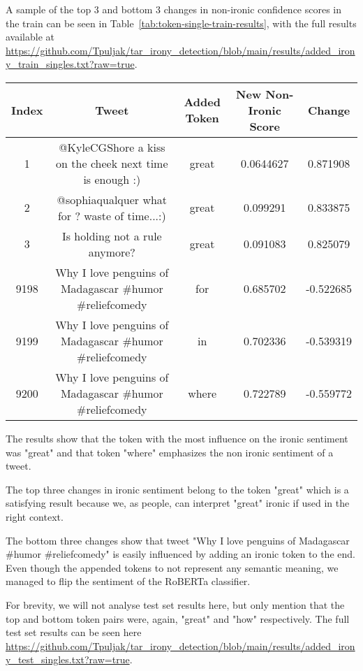 \documentclass[10pt, a4paper]{article}
\begin{document}
A sample of the top 3 and bottom 3 changes in non-ironic confidence scores in the train can be seen in Table~\ref{tab:token-single-train-results}, with the full results available at \url{https://github.com/Tpuljak/tar_irony_detection/blob/main/results/added_irony_train_singles.txt?raw=true}.

\begin{table*}
\caption{Sample of Single Token Results on the Train Set}
\label{tab:token-single-train-results}
\begin{center}
\begin{tabular}{c|c|c|c|c}
\toprule
Index & Tweet & Added Token & New Non-Ironic Score & Change\\
\midrule
1     & @KyleCGShore a kiss on the cheek next time is enough :)   & great & 0.0644627 & 0.871908 \\
2     & @sophiaqualquer what for ? waste of time...:)             & great & 0.099291  & 0.833875 \\
3     & Is holding not a rule anymore?                            & great & 0.091083  & 0.825079 \\
9198  & Why I love penguins of Madagascar  \#humor \#reliefcomedy & for   & 0.685702  & -0.522685 \\
9199  & Why I love penguins of Madagascar  \#humor \#reliefcomedy & in    & 0.702336  & -0.539319 \\
9200  & Why I love penguins of Madagascar  \#humor \#reliefcomedy & where & 0.722789  & -0.559772 \\
\bottomrule
\end{tabular}
\end{center}
\end{table*}
  
The results show that the token with the most influence on the ironic sentiment was "great" and that token "where" emphasizes the non ironic sentiment of a tweet.

The top three changes in ironic sentiment belong to the token "great" which is a satisfying result because we, as people, can interpret "great" ironic if used in the right context.

The bottom three changes show that tweet "Why I love penguins of Madagascar  \#humor \#reliefcomedy" is easily influenced by adding an ironic token to the end.
Even though the appended tokens to not represent any semantic meaning, we managed to flip the sentiment of the RoBERTa classifier.

For brevity, we will not analyse test set results here, but only mention that the top and bottom token pairs were, again, "great" and "how" respectively.
The full test set results can be seen here \url{https://github.com/Tpuljak/tar_irony_detection/blob/main/results/added_irony_test_singles.txt?raw=true}.
\end{document}
